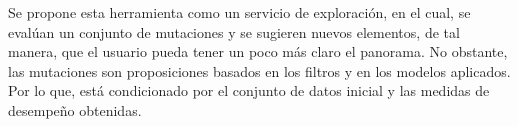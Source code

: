 Se propone esta herramienta como un servicio de exploración, en el cual, se evalúan un conjunto de mutaciones y se sugieren nuevos elementos, de tal manera, que el usuario pueda tener un poco más claro el panorama. No obstante, las mutaciones son proposiciones basados en los filtros y en los modelos aplicados. Por lo que, está condicionado por el conjunto de datos inicial y las medidas de desempeño obtenidas. 
